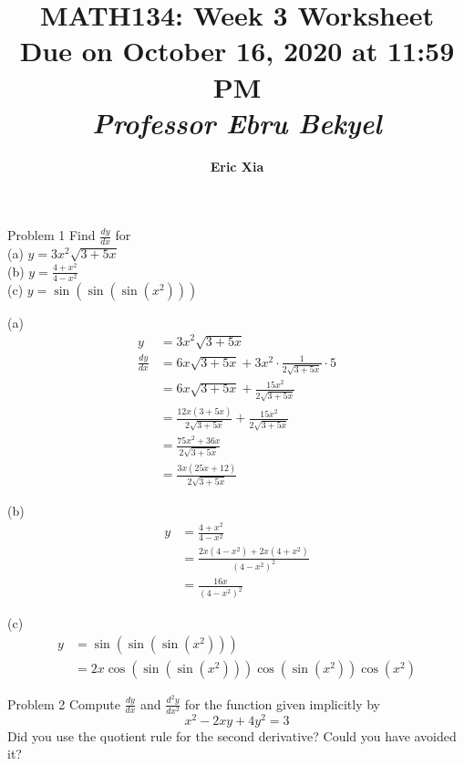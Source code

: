 \documentclass{article}
\title{
    \vspace{2in}
    \textmd{\textbf{MATH134: Week 3 Worksheet}}\\
    \normalsize\vspace{0.1in}\small{Due on October 16, 2020 at 11:59 PM}\\
    \vspace{0.1in}\large{\textit{Professor Ebru Bekyel}}
    \vspace{3in}
}
\author{\textbf{Eric Xia}}
\date{}
\begin{document}
    \maketitle
    \pagebreak

    \thispagestyle{page2}

    \begin{tbhtheorem}{Problem 1}
        Find $\frac{dy}{dx}$ for \\
        (a) $y = 3x^2 \sqrt{3 + 5x}$ \\
        (b) $y = \frac{4 + x^2}{4 - x^2}$ \\
        (c) $y = \sin{\left(\sin{\left(\sin{\left(x^2\right)}\right)}\right)}$
    \end{tbhtheorem}

    (a)
    \begin{align*}
        y                   &= 3x^2 \sqrt{3 + 5x} \\
        \frac{dy}{dx}       &= 6x\sqrt{3+5x} + 3x^2 \cdot \frac{1}{2\sqrt{3+5x}}\cdot 5 \\
                            &= 6x\sqrt{3+5x} + \frac{15x^2}{2\sqrt{3 + 5x}} \\
                            &= \frac{12x(3+5x)}{2\sqrt{3+5x}} + \frac{15x^2}{2\sqrt{3+5x}} \\
                            &= \frac{75x^2 + 36x}{2\sqrt{3 + 5x}} \\
                            &= \frac{3x(25x+12)}{2\sqrt{3+5x}}
    \end{align*}

    (b)
    \begin{align*}
        y                   &= \frac{4+x^2}{4-x^2} \\
                            &= \frac{2x(4-x^2) + 2x(4 + x^2)}{(4-x^2)^2} \\
                            &= \frac{16x}{(4-x^2)^2}
    \end{align*}

    (c)
    \begin{align*}
        y                   &= \sin{\left(\sin{\left(\sin{\left(x^2\right)}\right)}\right)} \\
                            &= 2x\cos{\left(\sin{\left(\sin{\left(x^2\right)}\right)}\right)}\cos{\left(\sin{\left(x^2\right)}\right)}\cos{\left(x^2\right)}
    \end{align*}

    \begin{tbhtheorem}{Problem 2}
        Compute $\frac{dy}{dx}$ and $\frac{d^2 y}{dx^2}$ for the function given implicitly by
        \[
            x^2 - 2xy + 4y^2 = 3
        \]
        Did you use the quotient rule for the second derivative? Could you have avoided it?
    \end{tbhtheorem}
\end{document}
